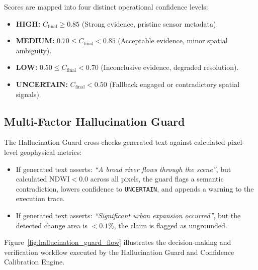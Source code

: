 \documentclass[12pt,a4paper]{report}
\begin{document}
Scores are mapped into four distinct operational confidence levels:
\begin{itemize}
    \item \textbf{HIGH:} $C_{\text{final}} \ge 0.85$ (Strong evidence, pristine sensor metadata).
    \item \textbf{MEDIUM:} $0.70 \le C_{\text{final}} < 0.85$ (Acceptable evidence, minor spatial ambiguity).
    \item \textbf{LOW:} $0.50 \le C_{\text{final}} < 0.70$ (Inconclusive evidence, degraded resolution).
    \item \textbf{UNCERTAIN:} $C_{\text{final}} < 0.50$ (Fallback engaged or contradictory spatial signals).
\end{itemize}

\subsection{Multi-Factor Hallucination Guard}
The Hallucination Guard cross-checks generated text against calculated pixel-level geophysical metrics:
\begin{itemize}
    \item If generated text asserts: \textit{``A broad river flows through the scene''}, but calculated $\text{NDWI} < 0.0$ across all pixels, the guard flags a semantic contradiction, lowers confidence to \texttt{UNCERTAIN}, and appends a warning to the execution trace.
    \item If generated text asserts: \textit{``Significant urban expansion occurred''}, but the detected change area is $< 0.1\%$, the claim is flagged as ungrounded.
\end{itemize}

Figure~\ref{fig:hallucination_guard_flow} illustrates the decision-making and verification workflow executed by the Hallucination Guard and Confidence Calibration Engine.
\end{document}

